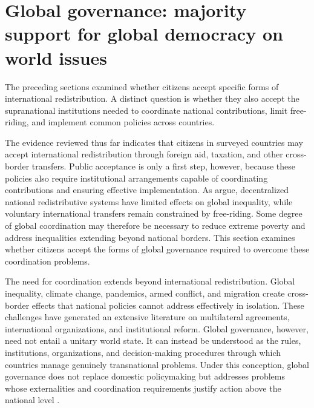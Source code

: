 \section{Global governance: majority support for global democracy on world issues}

The preceding sections examined whether citizens accept specific forms of international redistribution. A distinct question is whether they also accept the supranational institutions needed to coordinate national contributions, limit free-riding, and implement common policies across countries.

The evidence reviewed thus far indicates that citizens in surveyed countries may accept international redistribution through foreign aid, taxation, and other cross-border transfers. Public acceptance is only a first step, however, because these policies also require institutional arrangements capable of coordinating contributions and ensuring effective implementation. 
As \citet{kopczuk_limitations_2005} argue, decentralized national redistributive systems have limited effects on global inequality, while voluntary international transfers remain constrained by free-riding. Some degree of global coordination may therefore be necessary to reduce extreme poverty and address inequalities extending beyond national borders. This section examines whether citizens accept the forms of global governance required to overcome these coordination problems.

The need for coordination extends beyond international redistribution. Global inequality, climate change, pandemics, armed conflict, and migration create cross-border effects that national policies cannot address effectively in isolation. These challenges have generated an extensive literature on multilateral agreements, international organizations, and institutional reform. Global governance, however, need not entail a unitary world state. It can instead be understood as the rules, institutions, organizations, and decision-making procedures through which countries manage genuinely transnational problems. Under this conception, global governance does not replace domestic policymaking but addresses problems whose externalities and coordination requirements justify action above the national level \citep{ghassim_who_2024,dryzek_global_2011}.

